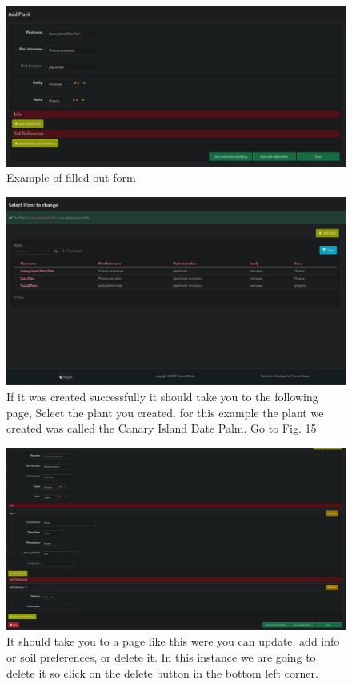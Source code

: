 \documentclass{article}
\begin{document}
        \begin{figure}
            \centering
            \caption{Example of filled out form}
            \includegraphics[scale=0.4]{crud3}
        \end{figure}
    
         \begin{figure}
            \centering
            \caption{If it was created successfully it should take you to the following page, Select the plant you created. for this example the plant we created was called the Canary Island Date Palm. Go to Fig. 15}
            \includegraphics[scale=0.4]{crud4}
        \end{figure}
        
        \begin{figure}
            \centering
            \caption{It should take you to a page like this were you can update, add info or soil preferences, or delete it. In this instance we are going to delete it so click on the delete button in the bottom left corner.}
            \includegraphics[scale=0.4]{crud5}
        \end{figure}
    
\end{document}
